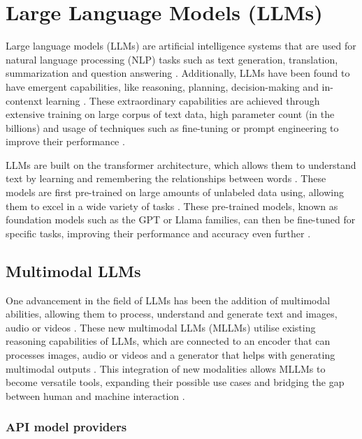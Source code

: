 \section{Large Language Models (LLMs)}

Large language models (LLMs) are artificial intelligence systems that are used for natural language processing (NLP) tasks such as text generation, translation, summarization and question answering \parencite{llm2,llm_healthcare}. Additionally, LLMs have been found to have emergent capabilities, like reasoning, planning, decision-making and in-contenxt learning \parencite{llm2}. These extraordinary capabilities are achieved through extensive training on large corpus of text data, high parameter count (in the billions) and usage of techniques such as fine-tuning or prompt engineering to improve their performance \parencite{llm2,llm_healthcare}.

LLMs are built on the transformer architecture, which allows them to understand text by learning and remembering the relationships between words \parencite{llm}. These models are first pre-trained on large amounts of unlabeled data using, allowing them to excel in a wide variety of tasks \parencite{foundation, llm2}. These pre-trained models, known as foundation models such as the GPT or Llama families, can then be fine-tuned for specific tasks, improving their performance and accuracy even further \parencite{gpt4,llama3,llm2}.

\subsection{Multimodal LLMs}

One advancement in the field of LLMs has been the addition of multimodal abilities, allowing them to process, understand and generate text and images, audio or videos \parencite{mllm, mllm2}. These new multimodal LLMs (MLLMs) utilise existing reasoning capabilities of LLMs, which are connected to an encoder that can processes images, audio or videos and a generator that helps with generating multimodal outputs \parencite{mllm}. This integration of new modalities allows MLLMs to become versatile tools, expanding their possible use cases and bridging the gap between human and machine interaction \parencite{llm_healthcare}.

\subsubsection{API model providers}

